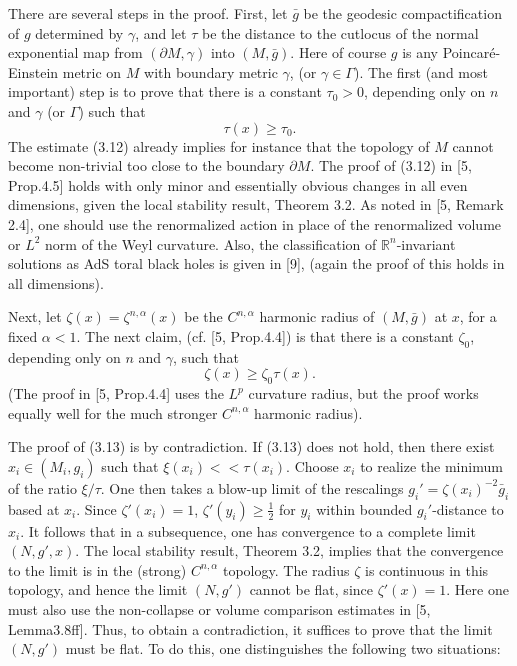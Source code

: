 \documentclass[11pt,amsfonts]{amsart}
\begin{document}
 There are several steps in the proof. First, let $\bar g$ be the 
geodesic compactification of $g$ determined by $\gamma$, and let $\tau$ 
be the distance to the cutlocus of the normal exponential map from 
$(\partial M, \gamma)$ into $(M, \bar g)$. Here of course $g$ is 
any Poincar\'e-Einstein metric on $M$ with boundary metric $\gamma$, (or 
$\gamma\in\Gamma$). The first (and most important) step is to prove that 
there is a constant $\tau_{0} > 0$, depending only on $n$ and $\gamma$ (or 
$\Gamma$) such that
\begin{equation} \label{e3.12}
\tau (x) \geq  \tau_{0}. 
\end{equation}
The estimate (3.12) already implies for instance that the topology of 
$M$ cannot become non-trivial too close to the boundary $\partial M$. 
The proof of (3.12) in [5, Prop.4.5] holds with only minor and essentially 
obvious changes in all even dimensions, given the local stability result, 
Theorem 3.2. As noted in [5, Remark 2.4], one should use the renormalized action 
in place of the renormalized volume or $L^{2}$ norm of the Weyl curvature. Also, 
the classification of ${\mathbb R}^{n}$-invariant solutions as AdS toral 
black holes is given in [9], (again the proof of this holds in all dimensions). 

 Next, let $\zeta (x) = \zeta^{n,\alpha}(x)$ be the $C^{n,\alpha}$ harmonic 
radius of $(M, \bar g)$ at $x$, for a fixed $\alpha < 1$. The next claim, 
(cf. [5, Prop.4.4]) is that there is a constant $\zeta_{0}$, depending only 
on $n$ and $\gamma$, such that
\begin{equation} \label{e3.13}
\zeta (x) \geq  \zeta_{0}\tau (x). 
\end{equation}
(The proof in [5, Prop.4.4] uses the $L^{p}$ curvature radius, but the 
proof works equally well for the much stronger $C^{n,\alpha}$ harmonic 
radius). 

  The proof of (3.13) is by contradiction. If (3.13) does not hold, then 
there exist $x_{i}\in (M_{i}, g_{i})$ such that $\xi (x_{i}) << \tau 
(x_{i})$. Choose $x_{i}$ to realize the minimum of the ratio $\xi /\tau$. 
One then takes a blow-up limit of the rescalings $g_{i}'  = \zeta 
(x_{i})^{-2}\bar g_{i}$ based at $x_{i}$. Since $\zeta'(x_{i}) = 1$, 
$\zeta'(y_{i}) \geq \frac{1}{2}$ for $y_{i}$ within bounded 
$g_{i}'$-distance to $x_{i}$. It follows that in a subsequence, one has 
convergence to a complete limit $(N, g', x)$. The local stability result, 
Theorem 3.2, implies that the convergence to the limit is in the (strong) 
$C^{n,\alpha}$ topology. The radius $\zeta$ is continuous in this topology, 
and hence the limit $(N, g')$ cannot be flat, since $\zeta'(x) = 1$. Here 
one must also use the non-collapse or volume comparison estimates in 
[5, Lemma3.8ff]. Thus, to obtain a contradiction, it suffices to prove 
that the limit $(N, g')$ must be flat. To do this, one distinguishes the 
following two situations:
\end{document}
